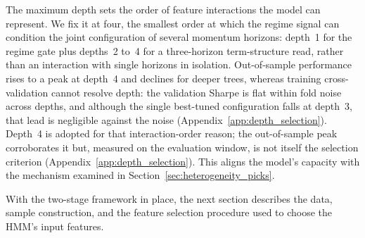 The maximum depth sets the order of feature interactions the model can represent. We fix it at four, the smallest order at which the regime signal can condition the joint configuration of several momentum horizons: depth~1 for the regime gate plus depths~2 to~4 for a three-horizon term-structure read, rather than an interaction with single horizons in isolation. Out-of-sample performance rises to a peak at depth~4 and declines for deeper trees, whereas training cross-validation cannot resolve depth: the validation Sharpe is flat within fold noise across depths, and although the single best-tuned configuration falls at depth~3, that lead is negligible against the noise (Appendix~\ref{app:depth_selection}). Depth~4 is adopted for that interaction-order reason; the out-of-sample peak corroborates it but, measured on the evaluation window, is not itself the selection criterion (Appendix~\ref{app:depth_selection}). This aligns the model's capacity with the mechanism examined in Section~\ref{sec:heterogeneity_picks}.\label{sec:depth_analysis}

With the two-stage framework in place, the next section describes the data, sample construction, and the feature selection procedure used to choose the HMM's input features.
